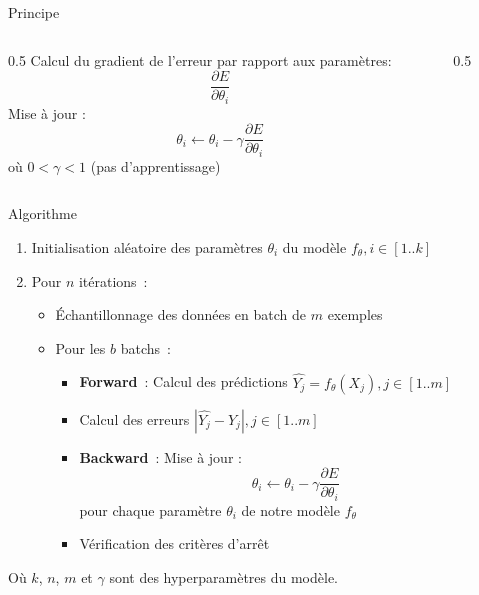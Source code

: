 
\begin{frame}{Principe}
  \begin{columns}
    \begin{column}{0.5\tw}
      Calcul du gradient de l'erreur par rapport aux paramètres:
      \[
        \frac{\partial{E}}{\partial{\theta_i}}
      \]
      Mise à jour :
      \[
        \theta_i \leftarrow \theta_i - \gamma\frac{\partial{E}}{\partial{\theta_i}}
      \]
      où $0 < \gamma < 1$ (pas d'apprentissage)
    \end{column}
    \begin{column}{0.5\tw}
    \end{column}
  \end{columns}
\end{frame}

\begin{frame}{Algorithme}
  \begin{enumerate}[<+->]
    \item Initialisation aléatoire des paramètres $\theta_i$ du modèle $f_{\theta}, i\in[1..k]$
    \item Pour $n$ itérations~:
      \begin{itemize}
        \item Échantillonnage des données en batch de $m$ exemples
        \item Pour les $b$ batchs~:
        \begin{itemize}
          \item \textbf{Forward}~: Calcul des prédictions $\hat{Y_j} = f_{\theta}(X_j), j\in[1..m]$
          \item Calcul des erreurs $|\hat{Y_j}-Y_j|, j\in[1..m]$
          \item \textbf{Backward}~: Mise à jour :
          \[
            \theta_i \leftarrow \theta_i - \gamma\frac{\partial{E}}{\partial{\theta_i}}
          \]
          pour chaque paramètre $\theta_i$ de notre modèle $f_\theta$ \\$\,$

          \item Vérification des critères d'arrêt
        \end{itemize}
      \end{itemize}
  \end{enumerate}

  Où $k$, $n$, $m$ et $\gamma$ sont des hyperparamètres du modèle.
\end{frame}



